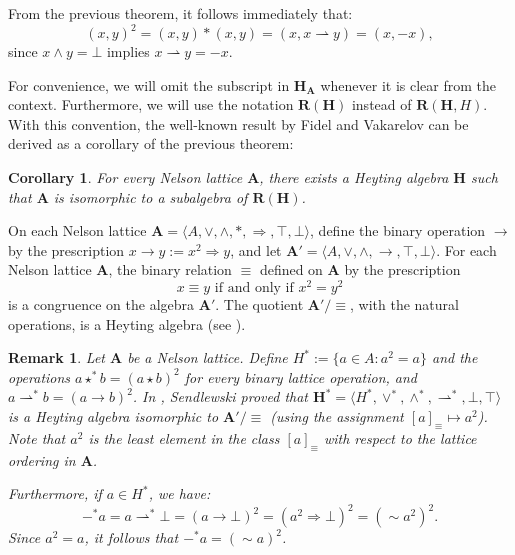 \documentclass[pdflatex,sn-mathphys-num]{sn-jnl}%
\newtheorem{corollary}{Corollary}
\newcommand{\A}{\mathbf{A}}
\newcommand{\R}[2]{\mathbf{R}(#1,#2)}
\newcommand{\RH}[1]{\mathbf{R}(#1)}
\newcommand{\He}{\mathbf{H}}
\newcommand{\To}{\Rightarrow}
\theoremstyle{thmstyleone}%
\theoremstyle{thmstyletwo}%
\newtheorem{remark}{Remark}%
\theoremstyle{thmstylethree}%
\begin{document}
 From the previous theorem, it follows immediately that:
 \[
    (x,y)^2=(x,y)*(x,y)=(x,x\rightharpoonup y)=(x,-x),
\]
since $x\wedge y=\bot$ implies $x\rightharpoonup y=-x$.

For convenience, we will omit the subscript in $\He_\A$ whenever it is clear from the context. Furthermore, we will use the notation $\RH{\He}$ instead of $\R{\He}{H}$. With this convention, the well-known result by Fidel and Vakarelov can be derived as a corollary of the previous theorem:

\begin{corollary}
For every Nelson lattice $\A$, there exists a Heyting algebra $\He$ such that $\A$ is isomorphic to a subalgebra of $\RH{\He}$.
\end{corollary}


On each Nelson lattice $\A = \langle A, \vee, \wedge, *, \To, \top, \bot \rangle$, define the binary operation $\to$ by the prescription $x \to y := x^2 \To y$, and let $\A' = \langle A, \vee, \wedge, \to, \top, \bot \rangle$. For each Nelson lattice $\A$, the binary relation $\equiv$ defined on $\A$ by the prescription 
\begin{equation} \label{equivalencia}
x \equiv y \text{ if and only if } x^2 = y^2
\end{equation}
is a congruence on the algebra $\A'$. The quotient $\A'/\equiv$, with the natural operations, is a Heyting algebra (see \cite[Theorem 3.4]{Busaniche}). 

\begin{remark} \label{SpecialHeytingAlgebra}
Let $\A$ be a Nelson lattice. Define $H^* := \{ a \in A : a^2 = a \}$ and the operations $a \star^* b = (a \star b)^2$ for every binary lattice operation, and $a \rightharpoonup^* b = (a \to b)^2$. In \cite{Sendlewski}, Sendlewski proved that $\He^* = \langle H^*, \vee^*, \wedge^*, \rightharpoonup^*, \bot, \top \rangle$ is a Heyting algebra isomorphic to $\A'/\equiv$ (using the assignment $[a]_\equiv \mapsto a^2$). Note that $a^2$ is the least element in the class $[a]_\equiv$ with respect to the lattice ordering in $\A$. 

Furthermore, if $a \in H^*$, we have:
\[
-^* a = a \rightharpoonup^* \bot = (a \to \bot)^2 = (a^2 \To \bot)^2 = (\sim a^2)^2.
\]
Since $a^2 = a$, it follows that $-^* a = (\sim a)^2$.
\end{remark}
\end{document}
